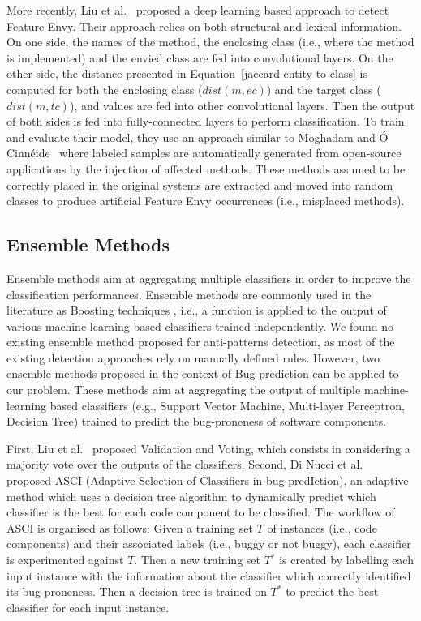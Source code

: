 More recently, Liu et al.~\cite{liu2018deep} proposed a deep learning based approach to detect Feature Envy. Their approach relies on both structural and lexical information. On one side, the names of the method, the enclosing class (i.e., where the method is implemented) and the envied class are fed into convolutional layers. On the other side, the distance presented in Equation~\ref{jaccard entity to class} is computed for both the enclosing class ($dist(m, ec)$) and the target class ($dist(m, tc)$), and values are fed into other convolutional layers. Then the output of both sides is fed into fully-connected layers to perform classification. To train and evaluate their model, they use an approach similar to Moghadam and Ó Cinnéide~\cite{moghadam2012automated} where labeled samples are automatically generated from open-source applications by the injection of affected methods. These methods assumed to be correctly placed in the original systems are extracted and moved into random classes to produce artificial Feature Envy occurrences (i.e., misplaced methods).

\subsection{Ensemble Methods}
Ensemble methods aim at aggregating multiple classifiers in order to improve the classification performances. Ensemble methods are commonly used in the literature as Boosting techniques \cite{rokach2010ensemble}, i.e., a function is applied to the output of various machine-learning based classifiers trained independently. We found no existing ensemble method proposed for anti-patterns detection, as most of the existing detection approaches rely on manually defined rules. However, two ensemble methods proposed in the context of Bug prediction can be applied to our problem. These methods aim at aggregating the output of multiple machine-learning based classifiers (e.g., Support Vector Machine, Multi-layer Perceptron, Decision Tree) trained to predict the bug-proneness of software components.

First, Liu et al.~\cite{liu2010evolutionary} proposed Validation and Voting, which consists in considering a majority vote over the outputs of the classifiers. Second, Di Nucci et al.~\cite{di2017dynamic} proposed ASCI (Adaptive Selection of Classifiers in bug predIction), an adaptive method which uses a decision tree algorithm to dynamically predict which classifier is the best for each code component to be classified. The workflow of ASCI is organised as follows: Given a training set $T$ of instances (i.e., code components) and their associated labels (i.e., buggy or not buggy), each classifier is experimented against $T$. Then a new training set $T^{*}$ is created by labelling each input instance with the information about the classifier which correctly identified its bug-proneness. Then a decision tree is trained on $T^{*}$ to predict the best classifier for each input instance.    
